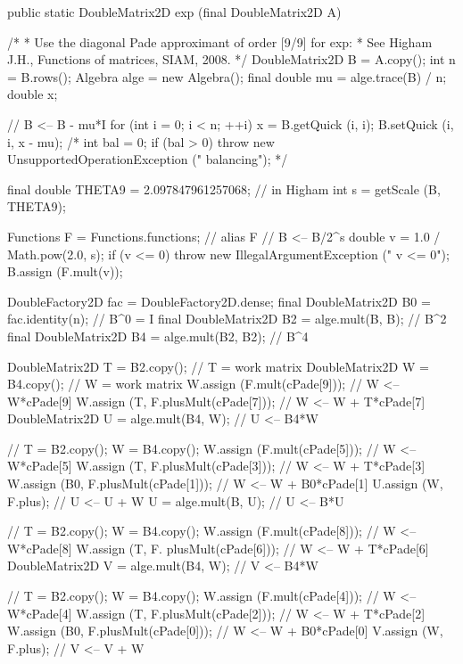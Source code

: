 \begin{code}

   public static DoubleMatrix2D exp (final DoubleMatrix2D A) \begin{hide} {
      /*
       * Use the diagonal Pade approximant of order [9/9] for exp:
       * See Higham J.H., Functions of matrices, SIAM, 2008.
       */
      DoubleMatrix2D B = A.copy();
      int n = B.rows();
      Algebra alge = new Algebra();
      final double mu = alge.trace(B) / n;
      double x;

      // B <-- B - mu*I
      for (int i = 0; i < n; ++i) {
         x = B.getQuick (i, i);
         B.setQuick (i, i, x - mu);
      }
      /*
      int bal = 0;
      if (bal > 0) {
         throw new UnsupportedOperationException ("   balancing");
      } */

      final double THETA9 = 2.097847961257068;   // in Higham
      int s = getScale (B, THETA9);

      Functions F = Functions.functions;    // alias F
      // B <-- B/2^s
      double v = 1.0 / Math.pow(2.0, s);
      if (v <= 0)
          throw new IllegalArgumentException ("   v <= 0");
      B.assign (F.mult(v));

      DoubleFactory2D fac = DoubleFactory2D.dense;
      final DoubleMatrix2D B0 = fac.identity(n);    // B^0 = I
      final DoubleMatrix2D B2 = alge.mult(B, B);    // B^2
      final DoubleMatrix2D B4 = alge.mult(B2, B2);  // B^4

      DoubleMatrix2D T = B2.copy();          // T = work matrix
      DoubleMatrix2D W = B4.copy();          // W = work matrix
      W.assign (F.mult(cPade[9]));           // W <-- W*cPade[9]
      W.assign (T, F.plusMult(cPade[7]));    // W <-- W + T*cPade[7]
      DoubleMatrix2D U = alge.mult(B4, W);   // U <-- B4*W

      // T = B2.copy();
      W = B4.copy();
      W.assign (F.mult(cPade[5]));           // W <-- W*cPade[5]
      W.assign (T, F.plusMult(cPade[3]));    // W <-- W + T*cPade[3]
      W.assign (B0, F.plusMult(cPade[1]));   // W <-- W + B0*cPade[1]
      U.assign (W, F.plus);                  // U <-- U + W
      U = alge.mult(B, U);                   // U <-- B*U

      // T = B2.copy();
      W = B4.copy();
      W.assign (F.mult(cPade[8]));           // W <-- W*cPade[8]
      W.assign (T, F. plusMult(cPade[6]));   // W <-- W + T*cPade[6]
      DoubleMatrix2D V = alge.mult(B4, W);   // V <-- B4*W

      // T = B2.copy();
      W = B4.copy();
      W.assign (F.mult(cPade[4]));           // W <-- W*cPade[4]
      W.assign (T, F.plusMult(cPade[2]));    // W <-- W + T*cPade[2]
      W.assign (B0, F.plusMult(cPade[0]));   // W <-- W + B0*cPade[0]
      V.assign (W, F.plus);                  // V <-- V + W

}
\end{hide}
\end{code}
